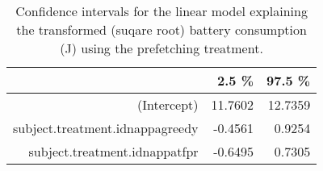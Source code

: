 \begin{table}[ht]
\centering
\begin{tabular}{rrr}
  \hline
 & 2.5 \% & 97.5 \% \\ 
  \hline
(Intercept) & 11.7602 & 12.7359 \\ 
  subject.treatment.idnappagreedy & -0.4561 & 0.9254 \\ 
  subject.treatment.idnappatfpr & -0.6495 & 0.7305 \\ 
   \hline
\end{tabular}
\caption{Confidence intervals for the linear model explaining the transformed (suqare root) battery consumption (J) using the prefetching treatment.} 
\label{tab:hypothesis:battery:confint}
\end{table}
